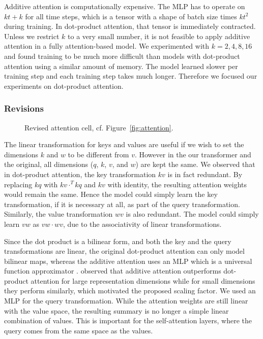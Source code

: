 \documentclass[11pt]{article}
\DeclareMathOperator{\softmax}{softmax}
\begin{document}
Additive attention is computationally expensive.
The MLP has to operate on \(kt + k\) for all time steps,
which is a tensor with a shape of batch size times \(kt^{2}\) during training.
In dot-product attention, that tensor is immediately contracted.
Unless we restrict \(k\) to a very small number,
it is not feasible to apply additive attention in a fully attention-based model.
We experimented with \(k = 2, 4, 8, 16\) and found training to be much more difficult than
models with dot-product attention using a similar amount of memory.
The model learned slower per training step and each training step takes much longer.
Therefore we focused our experiments on dot-product attention.

\subsubsection*{Revisions}

\begin{figure}
\centering
{}
\caption{\label{fig:revis}Revised attention cell, cf. Figure~\ref{fig:attention}.}
\end{figure}

The linear transformation for keys and values are useful
if we wish to set the dimensions \(k\) and \(w\) to be different from \(v\).
However in the our transformer and the original,
all dimensions (\(q\), \(k\), \(v\), and \(w\)) are kept the same.
We observed that in dot-product attention,
the key transformation \(kv\) is in fact redundant.
By replacing \(kq\) with \(kv \cdot^{T} kq\) and \(kv\) with identity,
the resulting attention weights would remain the same.
Hence the model could simply learn the key transformation, if it is necessary at all,
as part of the query transformation.
Similarly, the value transformation \(wv\) is also redundant.
The model could simply learn \(vw\) as \(vw \cdot wv\),
due to the associativity of linear transformations.

Since the dot product is a bilinear form,
and both the key and the query transformations are linear,
the original dot-product attention can only model bilinear maps,
whereas the additive attention uses an MLP which is
a universal function approximator \parencite{hornik1989multilayer}.
\textcite{vaswani2017attention} observed that additive attention outperforms dot-product attention
for large representation dimensions while for small dimensions they perform similarly,
which motivated the proposed scaling factor.
We used an MLP for the query transformation.
While the attention weights are still linear with the value space,
the resulting summary is no longer a simple linear combination of values.
This is important for the self-attention layers,
where the query comes from the same space as the values.
\end{document}
